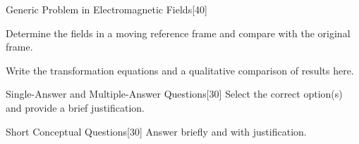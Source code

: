 \documentclass[11pt]{article}
\begin{document}
\begin{examproblems}
\begin{problem}{Generic Problem in Electromagnetic Fields}[40]
\begin{questions}
\question Determine the fields in a moving reference frame and compare with the original frame.

\begin{solution}
Write the transformation equations and a qualitative comparison of results here.
\end{solution}

\end{questions}
\end{problem}

\begin{problem}{Single-Answer and Multiple-Answer Questions}[30]
Select the correct option(s) and provide a brief justification.

\begin{questions}


\begin{choices}[2]
\end{choices}


\begin{choices}[2]
\end{choices}

\end{questions}
\end{problem}

\begin{problem}{Short Conceptual Questions}[30]
Answer briefly and with justification.


\end{problem}
\end{examproblems}
\end{document}
